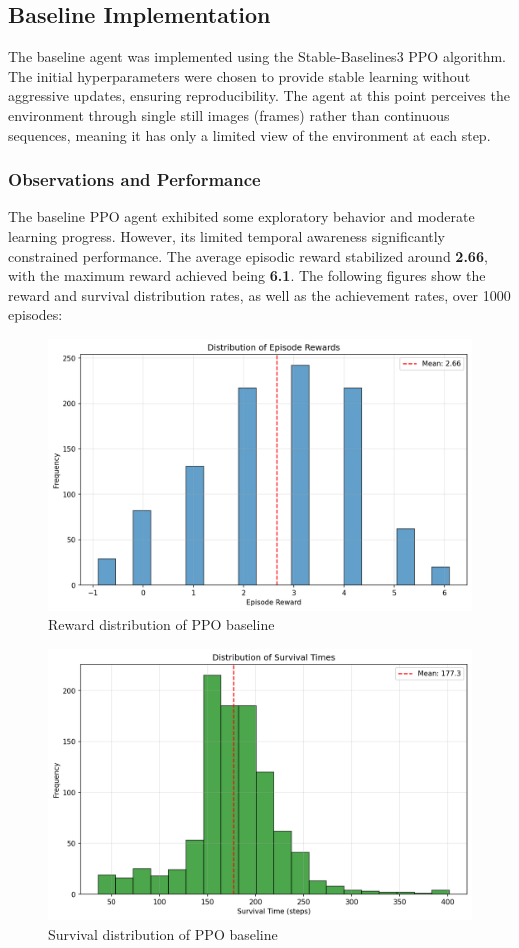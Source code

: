 \documentclass[twocolumn]{article}
\begin{document}
\subsection*{Baseline Implementation}
The baseline agent was implemented using the Stable-Baselines3 PPO algorithm. The initial hyperparameters were chosen to provide stable learning without aggressive updates, ensuring reproducibility. The agent at this point perceives the environment through single still images (frames) rather than continuous sequences, meaning it has only a limited view of the environment at each step.
\subsubsection*{Observations and Performance}
The baseline PPO agent exhibited some exploratory behavior and moderate learning progress. However, its limited temporal awareness significantly constrained performance. The average episodic reward stabilized around \textbf{2.66}, with the maximum reward achieved being \textbf{6.1}.
The following figures show the reward and survival distribution rates, as well as the achievement rates, over 1000 episodes:
\begin{figure}[H]
    \centering
    \includegraphics[width=0.75\linewidth]{images/reward_distribution_ppo_baseline_1000_episodes.png}
    \caption{Reward distribution of PPO baseline}
    \label{fig:placeholder}
\end{figure}
\begin{figure}[H]
    \centering
    \includegraphics[width=0.75\linewidth]{images/survival_distribution_ppo_baseline_1000_episodes.png}
    \caption{Survival distribution of PPO baseline}
    \label{fig:placeholder}
\end{figure}
\end{document}
